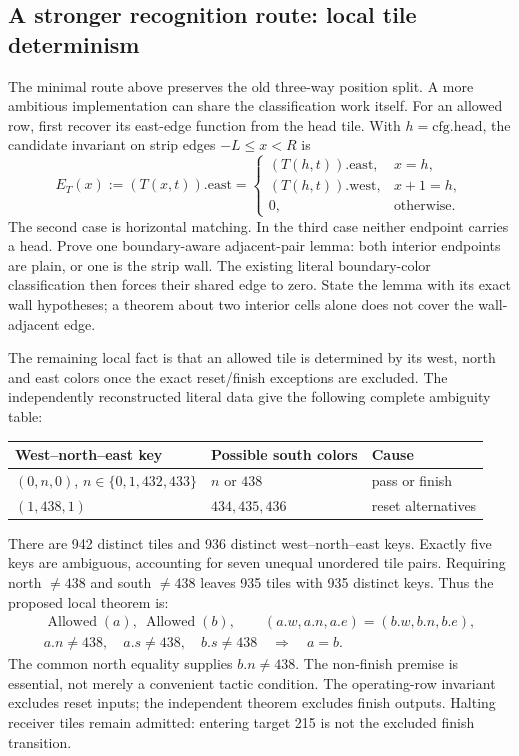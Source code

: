 \documentclass[11pt]{article}
\newcommand{\code}[1]{\texttt{\detokenize{#1}}}
\begin{document}
\subsection{A stronger recognition route: local tile determinism}

The minimal route above preserves the old three-way position split. A more ambitious implementation can share the classification work itself. For an allowed row, first recover its east-edge function from the head tile. With \(h=\mathrm{cfg.head}\), the candidate invariant on strip edges \(-L\le x<R\) is
\[
 E_T(x):=(T(x,t)).\mathrm{east}=
 \begin{cases}
 (T(h,t)).\mathrm{east},&x=h,\\
 (T(h,t)).\mathrm{west},&x+1=h,\\
 0,&\text{otherwise}.
 \end{cases}
\]
The second case is horizontal matching. In the third case neither endpoint carries a head. Prove one boundary-aware adjacent-pair lemma: both interior endpoints are plain, or one is the strip wall. The existing literal boundary-color classification then forces their shared edge to zero. State the lemma with its exact wall hypotheses; a theorem about two interior cells alone does not cover the wall-adjacent edge.

The remaining local fact is that an allowed tile is determined by its west, north and east colors once the exact reset/finish exceptions are excluded. The independently reconstructed literal data give the following complete ambiguity table:
\begin{center}\small
\begin{tabular}{@{}lll@{}}\toprule
West--north--east key & Possible south colors & Cause\\\midrule
\((0,n,0)\), \(n\in\{0,1,432,433\}\) & \(n\) or \(438\) & pass or finish\\
\((1,438,1)\) & \(434,435,436\) & reset alternatives\\\bottomrule
\end{tabular}
\end{center}
There are 942 distinct tiles and 936 distinct west--north--east keys. Exactly five keys are ambiguous, accounting for seven unequal unordered tile pairs. Requiring north \(\ne438\) and south \(\ne438\) leaves 935 tiles with 935 distinct keys. Thus the proposed local theorem is:
\[
\begin{gathered}
 \operatorname{Allowed}(a),\ \operatorname{Allowed}(b),\qquad
 (a.w,a.n,a.e)=(b.w,b.n,b.e),\\
 a.n\ne438,\quad a.s\ne438,\quad b.s\ne438
 \quad\Longrightarrow\quad a=b.
\end{gathered}
\]
The common north equality supplies \(b.n\ne438\). The non-finish premise is essential, not merely a convenient tactic condition. The operating-row invariant excludes reset inputs; the independent \code{no_south438} theorem excludes finish outputs. Halting receiver tiles remain admitted: entering target 215 is not the excluded finish transition.
\end{document}

